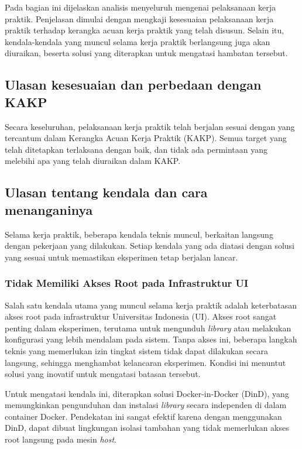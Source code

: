 Pada bagian ini dijelaskan analisis menyeluruh mengenai pelaksanaan kerja praktik. Penjelasan dimulai dengan mengkaji kesesuaian pelaksanaan kerja praktik terhadap kerangka acuan kerja praktik yang telah disusun. Selain itu, kendala-kendala yang muncul selama kerja praktik berlangsung juga akan diuraikan, beserta solusi yang diterapkan untuk mengatasi hambatan tersebut.

\subsection{Ulasan kesesuaian dan perbedaan dengan KAKP}

Secara keseluruhan, pelaksanaan kerja praktik telah berjalan sesuai dengan yang tercantum dalam Kerangka Acuan Kerja Praktik (KAKP). Semua target yang telah ditetapkan terlaksana dengan baik, dan tidak ada permintaan yang melebihi apa yang telah diuraikan dalam KAKP.

\subsection{Ulasan tentang kendala dan cara menanganinya}

Selama kerja praktik, beberapa kendala teknis muncul, berkaitan langsung dengan pekerjaan yang dilakukan. Setiap kendala yang ada diatasi dengan solusi yang sesuai untuk memastikan eksperimen tetap berjalan lancar.

\subsubsection{Tidak Memiliki Akses Root pada Infrastruktur UI}

Salah satu kendala utama yang muncul selama kerja praktik adalah keterbatasan akses root pada infrastruktur Universitas Indonesia (UI). Akses root sangat penting dalam eksperimen, terutama untuk mengunduh \textit{library} atau melakukan konfigurasi yang lebih mendalam pada sistem. Tanpa akses ini, beberapa langkah teknis yang memerlukan izin tingkat sistem tidak dapat dilakukan secara langsung, sehingga menghambat kelancaran eksperimen. Kondisi ini menuntut solusi yang inovatif untuk mengatasi batasan tersebut.

Untuk mengatasi kendala ini, diterapkan solusi Docker-in-Docker (DinD), yang memungkinkan pengunduhan dan instalasi \textit{library} secara independen di dalam container Docker. Pendekatan ini sangat efektif karena dengan menggunakan DinD, dapat dibuat lingkungan isolasi tambahan yang tidak memerlukan akses root langsung pada mesin \textit{host}.

